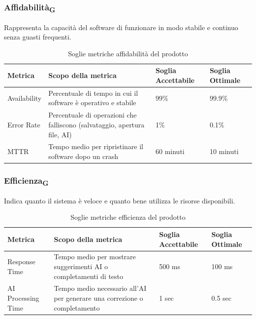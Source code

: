 \documentclass[11pt,a4paper]{article}
\begin{document}
\subsubsection{Affidabilità\textsubscript{G}}
Rappresenta la capacità del software di funzionare in modo stabile e continuo senza guasti frequenti.
\begin{table}[H]
\centering
\renewcommand{\arraystretch}{1.5}
\begin{tabular}{|M{0.25\textwidth}|M{0.35\textwidth}|M{0.15\textwidth}|M{0.15\textwidth}|}
\hline
\textbf{Metrica} & \textbf{Scopo della metrica} & \textbf{Soglia Accettabile} & \textbf{Soglia Ottimale} \\
\hline
Availability & Percentuale di tempo in cui il software è operativo e stabile & 99\% & 99.9\% \\ \hline
Error Rate & Percentuale di operazioni che falliscono (salvataggio, apertura file, AI) & 1\% & 0.1\% \\ \hline
MTTR & Tempo medio per ripristinare il software dopo un crash & 60 minuti & 10 minuti \\
\hline
\end{tabular}
\caption{Soglie metriche affidabilità del prodotto}
\end{table}

\subsubsection{Efficienza\textsubscript{G}}
Indica quanto il sistema è veloce e quanto bene utilizza le risorse disponibili.
\begin{table}[H]
\centering
\renewcommand{\arraystretch}{1.5}
\begin{tabular}{|M{0.25\textwidth}|M{0.35\textwidth}|M{0.15\textwidth}|M{0.15\textwidth}|}
\hline
\textbf{Metrica} & \textbf{Scopo della metrica} & \textbf{Soglia Accettabile} & \textbf{Soglia Ottimale} \\
\hline
Response Time & Tempo medio per mostrare suggerimenti AI o completamenti di testo & 500 ms & 100 ms \\ \hline
AI Processing Time & Tempo medio necessario all’AI per generare una correzione o completamento & 1 sec & 0.5 sec \\
\hline
\end{tabular}
\caption{Soglie metriche efficienza del prodotto}
\end{table}
\end{document}
